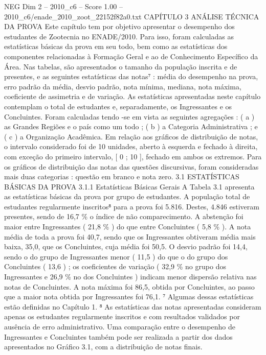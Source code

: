 \begin{textsample}{NEG Dim 2 – 2010\_c6 – Score 1.00 – 2010\_c6/enade\_2010\_zoot\_22152f82a0.txt}  \label{ex:f2_neg_246}
CAPÍTULO 3 ANÁLISE TÉCNICA DA PROVA Este capítulo tem por objetivo apresentar o desempenho dos estudantes de Zootecnia no ENADE/2010.
Para isso, foram calculadas as estatísticas básicas da prova em seu todo, bem como as estatísticas dos componentes relacionadas à Formação Geral e ao de Conhecimento Específico da Área.
Nas tabelas, são apresentados o tamanho da população inscrita e de presentes, e as seguintes estatísticas das notas⁷ : média do desempenho na prova, erro padrão da média, desvio padrão, nota mínima, mediana, nota máxima, coeficiente de assimetria e de variação.
As estatísticas apresentadas neste capítulo contemplam o total de estudantes e, separadamente, os Ingressantes e os Concluintes.
Foram calculadas tendo -se em vista as seguintes agregações : ( a ) as Grandes Regiões e o país como um todo ; ( b ) a Categoria Administrativa ; e ( c ) a Organização Acadêmica.
Em relação aos gráficos de distribuição de notas, o intervalo considerado foi de 10 unidades, aberto à esquerda e fechado à direita, com exceção do primeiro intervalo, [ 0 ; 10 ], fechado em ambos os extremos.
Para os gráficos de distribuição das notas das questões discursivas, foram consideradas mais duas categorias : questão em branco e nota zero. 3.1 ESTATÍSTICAS BÁSICAS DA PROVA 3.1.1 Estatísticas Básicas Gerais A Tabela 3.1 apresenta as estatísticas básicas da prova por grupo de estudantes.
A população total de estudantes regularmente inscritos⁸ para a prova foi 5.816.
Destes, 4.846 estiveram presentes, sendo de 16,7 \% o índice de não comparecimento.
A abstenção foi maior entre Ingressantes ( 21,8 \% ) do que entre Concluintes ( 5,8 \% ).
A nota média de toda a prova foi 40,7, sendo que os Ingressantes obtiveram média mais baixa, 35,0, que os Concluintes, cuja média foi 50,5.
O desvio padrão foi 14,4, sendo o do grupo de Ingressantes menor ( 11,5 ) do que o do grupo dos Concluintes ( 13,6 ) ; os coeficientes de variação ( 32,9 \% no grupo dos Ingressantes e 26,9 \% no dos Concluintes ) indicam menor dispersão relativa nas notas de Concluintes.
A nota máxima foi 86,5, obtida por Concluintes, ao passo que a maior nota obtida por Ingressantes foi 76,1. ⁷ Algumas dessas estatísticas estão definidas no Capítulo 1. ⁸ As estatísticas das notas apresentadas consideram apenas os estudantes regularmente inscritos e com resultados validados por ausência de erro administrativo.
Uma comparação entre o desempenho de Ingressantes e Concluintes também pode ser realizada a partir dos dados apresentados no Gráfico 3.1, com a distribuição de notas finais.

\end{textsample}
